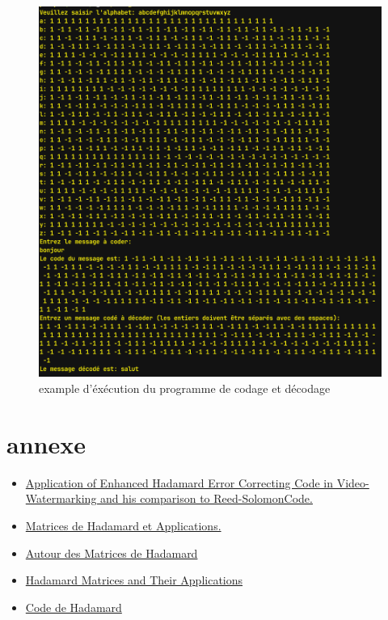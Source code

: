 \documentclass{article}
\begin{document}
\begin{figure}[h]
  \centering
  \includegraphics[width=1\textwidth]{code_decode.png}
  \caption{example d'éxécution du programme de codage et décodage}
  \label{codage décodage}
\end{figure}

\newpage
\section*{annexe}
\begin{itemize}
	\item \href{https://www.matec-conferences.org/articles/matecconf/pdf/2017/39/matecconf_cscc2017_05007.pdf}{Application of Enhanced Hadamard Error Correcting Code in 
		Video-Watermarking and his comparison to Reed-SolomonCode.}
	\item \href{https://math.univ-lille1.fr/~calgaro/TER_2018/wa_files/maire.pdf}
		{Matrices de Hadamard et Applications.}
	\item \href{http://jacquescellier.fr/maths/matrices_hadamard.pdf}
		{Autour des Matrices de Hadamard}
	\item \href{https://books.google.fr/books?hl=en&lr=&id=XaV7CwAAQBAJ&oi=fnd&pg=PA1&dq=le+code+de+hadamard&ots=lTY7NYeAOB&sig=PHyTnem5GyCK9jHSHf1WRQxGV_M&redir_esc=y#v=onepage&q=le\%20code\%20de\%20hadamard&f=false}
		{Hadamard Matrices and Their Applications}
	\item \href{https://fr.wikipedia.org/wiki/Code_de_Hadamard}{Code de Hadamard}
\end{itemize}
\end{document}
